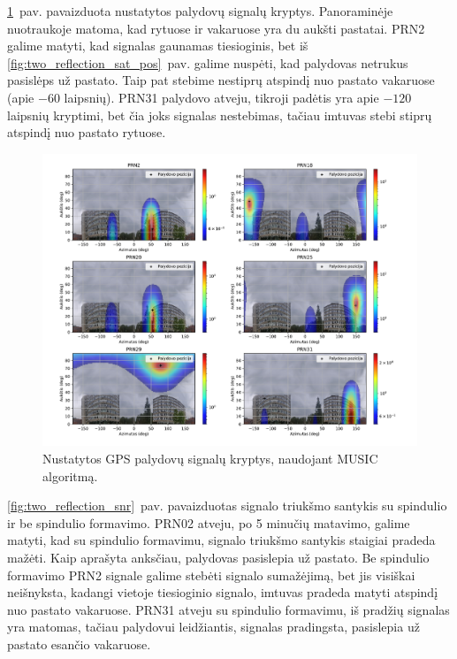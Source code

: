 \documentclass[main.tex]{subfiles}
\begin{document}
\ref{fig:two_reflection}~pav. pavaizduota nustatytos palydovų signalų kryptys.
Panoraminėje nuotraukoje matoma, kad rytuose ir vakaruose yra du aukšti pastatai.
PRN2 galime matyti, kad signalas gaunamas tiesioginis, bet iš
\ref{fig:two_reflection_sat_pos}~pav. galime nuspėti, kad palydovas netrukus
pasislėps už pastato. Taip pat stebime nestiprų atspindį nuo pastato vakaruose
(apie $-60$ laipsnių). PRN31 palydovo atveju, tikroji padėtis yra apie $-120$
laipsnių kryptimi, bet čia joks signalas nestebimas, tačiau imtuvas stebi stiprų
atspindį nuo pastato rytuose.

\begin{figure}[ht]
    \begin{centering}
    \includegraphics[scale=0.50]{drawings/two_reflections}
    \par\end{centering}
    \protect\caption{\label{fig:two_reflection}Nustatytos GPS palydovų signalų kryptys, naudojant MUSIC algoritmą.}
\end{figure}

\ref{fig:two_reflection_snr}~pav. pavaizduotas signalo triukšmo santykis su spindulio
ir be spindulio formavimo.  PRN02 atveju, po 5 minučių matavimo, galime
matyti, kad su spindulio formavimu,
signalo triukšmo santykis staigiai pradeda mažėti. Kaip aprašyta anksčiau, palydovas
pasislepia už pastato. Be spindulio formavimo PRN2 signale galime
stebėti signalo sumažėjimą, bet jis visiškai neišnyksta, kadangi
vietoje tiesioginio signalo, imtuvas pradeda matyti atspindį nuo pastato vakaruose.
PRN31 atveju su spindulio formavimu, iš pradžių signalas yra matomas, tačiau palydovui
leidžiantis, signalas pradingsta, pasislepia už pastato esančio vakaruose.
\end{document}
